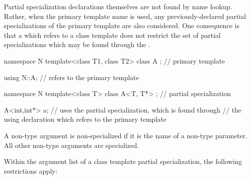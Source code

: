 \pnum
Partial specialization declarations themselves are not found by name lookup.
Rather, when the primary template name is used, any previously-declared partial
specializations of the primary template are also considered.
One consequence is
that a
which refers to a class template does not restrict the set of partial specializations
which may be found through the
.
\enterexample

\begin{codeblock}
namespace N {
  template<class T1, class T2> class A { };         // primary template
}

using N::A;                             // refers to the primary template

namespace N {
  template<class T> class A<T, T*> { }; // partial specialization
}

A<int,int*> a;                  // uses the partial specialization, which is found through
                                // the using declaration which refers to the primary template
\end{codeblock}
\exitexample

\pnum
A non-type argument is non-specialized if it is the name of a non-type
parameter.
All other non-type arguments are specialized.

\pnum
Within the argument list of a class template partial specialization,
the following restrictions apply:

